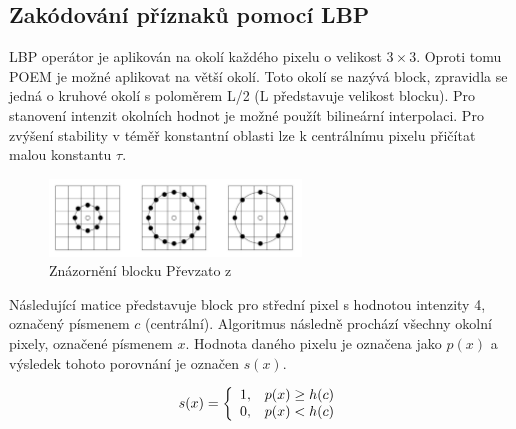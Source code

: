 \documentclass{report}
\begin{document}
\subsection{Zakódování příznaků pomocí LBP}
LBP operátor je aplikován na okolí každého pixelu o velikost $3 \times 3$. Oproti tomu POEM je možné aplikovat na větší okolí. Toto okolí se nazývá block, zpravidla se jedná o kruhové okolí s poloměrem L/2 (L představuje velikost blocku). Pro stanovení intenzit okolních hodnot je možné použít bilineární interpolaci. Pro zvýšení stability v téměř konstantní oblasti lze k centrálnímu pixelu přičítat malou konstantu $\tau$. 

\begin{figure}[H]
		\centering
		\includegraphics[width=253px]{./img/znazorneni_lbp.png}	
		\caption{Znázornění blocku Převzato z \cite{SrovnaniDeskriptoru}}
\end{figure}

Následující matice představuje block pro střední pixel s hodnotou intenzity 4, označený písmenem $c$ (centrální). Algoritmus následně prochází všechny okolní pixely, označené písmenem  $x$. Hodnota daného pixelu je označena jako $p(x)$ a výsledek tohoto porovnání je označen $s(x)$.

\begin{displaymath} 
	\label{asd2} 
		    s(x) = \left\{ \begin{array}{r@{\quad}c}
    		1, & p(x) \geq h(c) \\
    		0, & p(x) < h(c) \\ \end{array} \right. 
\end{displaymath}
\end{document}

